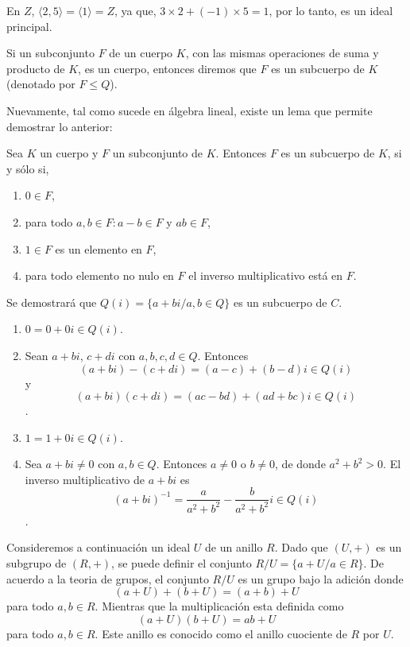 \begin{ejemplo}
En $Z$, $\langle 2,5 \rangle = \langle 1 \rangle = Z$, ya que, $3\times 2 + (-1)\times 5 = 1$, por lo tanto, es un ideal principal.
\end{ejemplo}
\begin{defi}
Si un subconjunto $F$ de un cuerpo $K$, con las mismas operaciones de suma y producto de $K$, es un cuerpo, entonces diremos que $F$ es un subcuerpo de $K$ (denotado por $F\leq Q$).
\end{defi}
Nuevamente, tal como sucede en álgebra lineal, existe un lema que permite demostrar lo anterior:
\begin{lema}
Sea $K$ un cuerpo y $F$ un subconjunto de $K$. Entonces $F$ es un subcuerpo de $K$, si y sólo si,
\begin{enumerate}
    \item $0\in F$,
    \item para todo $a,b\in F : a-b\in F$ y $ab\in F$,
    \item $1\in F$ es un elemento en $F$,
    \item para todo elemento no nulo en $F$ el inverso multiplicativo está en $F$.
\end{enumerate}
\end{lema}
\begin{ejemplo}
Se demostrará que $Q(i)=\lbrace a+bi/a,b\in Q \rbrace$ es un subcuerpo de $C$. 
\begin{enumerate}
    \item $0 = 0 + 0i \in Q(i)$.
    \item Sean $a+bi$, $c+di$ con $a,b,c,d\in Q$. Entonces
    \[(a+bi)-(c+di)=(a-c)+(b-d)i\in Q(i)\]
    y
    \[(a+bi)(c+di)=(ac-bd)+(ad+bc)i \in Q(i)\].
    \item $1=1+0i\in Q(i)$.
    \item Sea $a+bi \neq 0$ con $a,b\in Q$. Entonces $a\neq 0$ o $b\neq 0$, de donde $a^{2}+b^{2}>0$. El inverso multiplicativo de $a+bi$ es 
    \[(a+bi)^{-1}=\frac{a}{a^{2}+b^{2}}-\frac{b}{a^{2}+b^{2}}i\in Q(i)\].
\end{enumerate}
\end{ejemplo}
Consideremos a continuación un ideal $U$ de un anillo $R$. Dado que $(U,+)$ es un subgrupo de $(R,+)$, se puede definir el conjunto $R/U=\lbrace a+U/a\in R \rbrace$. De acuerdo a la teoria de grupos, el conjunto $R/U$ es un grupo bajo la adición donde 
\[(a+U)+(b+U)=(a+b)+U\]
para todo $a,b \in R$. Mientras que la multiplicación esta definida como
\[(a+U)(b+U)=ab+U\]
para todo $a,b\in R$. Este anillo es conocido como el anillo cuociente de $R$ por $U$.

